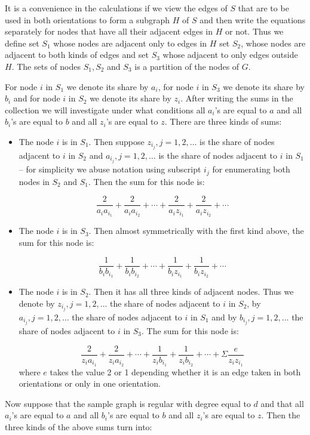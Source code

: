 It is a convenience in the calculations if we view the edges
of $S$ that are to be used in both orientations to form a subgraph $H$ of $S$
and then write the equations separately for nodes that have all their adjacent
edges in $H$ or not.
Thus we define set $S_1$ whose nodes are adjacent only to edges in $H$
set $S_2$, whose nodes are
adjacent to both kinds of edges and set $S_3$ whose adjacent to only edges outside $H$. The sets of nodes  $S_1,S_2$ and $S_3$ is a partition of the nodes of $G$.

For node $i$  in $S_1$ we denote its share by $a_i$, for node $i$ in $S_3$ we denote its share by $b_i$ and for node $i$ in $S_2$ we denote its share by $z_i$. After writing the sums in the
collection we will investigate under what conditions all $a_i$'s  are equal to $a$ and all $b_i$'s are equal to $b$ and all $z_i$'s are equal to $z$. There are three kinds of sums:

\begin{itemize}
\item
The node $i$ is in $S_1$.  Then suppose $z_{i_j}, j=1,2,\ldots$ is the share of nodes adjacent to $i$ in $S_2$ and $a_{i_j}, j=1,2,\ldots$
is the share of nodes adjacent to $i$ in $S_1$ -- for simplicity we abuse notation using subscript $i_j$ for enumerating both
nodes in $S_2$ and $S_1$. Then the sum for this node is:

$$\frac{2}{a_ia_{i_1}}+ \frac{2}{a_ia_{i_2}} + \cdots + \frac{2}{a_iz_{i_1}}+ \frac{2}{a_iz_{i_2}} + \cdots $$
\item The node $i$ is in $S_3$. Then almost
 symmetrically with the first kind above, the sum for this node is:

$$\frac{1}{b_ib_{i_1}}+ \frac{1}{b_ib_{i_2}} + \cdots + \frac{1}{b_iz_{i_1}}+ \frac{1}{b_iz_{i_2}} + \cdots $$
\item The
 node $i$ is in $S_2$.  Then it has all three kinds of adjacent nodes. Thus we
denote by $z_{i_j}, j=1,2,\ldots$  the share of nodes adjacent to $i$ in $S_2$, by  $a_{i_j}, j=1,2,\ldots$ the share of nodes adjacent to $i$ in $S_1$ and by $b_{i_j}, j=1,2,\ldots$ the share of nodes adjacent to $i$ in $S_3$. The sum for this node is:

$$\frac{2}{z_ia_{i_1}}+ \frac{2}{z_ia_{i_2}} + \cdots + \frac{1}{z_ib_{i_1}}+ \frac{1}{z_ib_{i_2}} + \cdots	+\Sigma \frac{e}{z_iz_{i_1}}$$
where $e$ takes the value 2 or 1 depending whether it is an edge taken in both
orientations or only in one orientation.
\end{itemize}
Now suppose  that the sample graph is regular with degree equal to $d$ and that all $a_i$'s  are equal to $a$ and all $b_i$'s are equal to $b$ and all $z_i$'s are equal to $z$. Then the three kinds of the above sums turn into:

